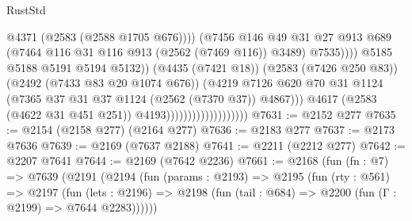 \begin{lexlean}{RustStd}
\begin{coremodule}
{\begin{coremodule}
{{{{{{{{{{{{{{{                                                          @4371
                                                          (@2583 (@2588 @1705 @676))))
                                                      (@7456
                                                        @146
                                                        @49
                                                        @31
                                                        @27
                                                        @913
                                                        @689
                                                        (@7464
                                                          @116
                                                          @31
                                                          @116
                                                          @913
                                                          (@2562 (@7469 @116))
                                                          @3489)
                                                        @7535))))
                                                @5185
                                                @5188
                                                @5191
                                                @5194
                                                @5132))
                                            (@4435 (@7421 @18))
                                            (@2583 (@7426 @250 @83))
                                            (@2492 (@7433 @83 @20 @1074 @676))
                                            (@4219
                                              @7126
                                              @620
                                              @70
                                              @31
                                              @1124
                                              (@7365 @37 @31 @37 @1124 (@2562 (@7370 @37)) @4867)))
                                          @4617
                                          (@2583 (@4622 @31 @451 @251))
                                          @4193)))))))))))))))))))
@7631 := @2152 @277
@7635 := @2154 (@2158 @277) (@2164 @277)
@7636 := @2183 @277
@7637 := @2173 @7636
@7639 := @2169 (@7637 @2188)
@7641 := @2211 (@2212 @277)
@7642 := @2207 @7641
@7644 := @2169 (@7642 @2236)
@7661 := @2168
    (fun (fn : @7) =>
    @7639
      (@2191
        (@2194
          (fun (params : @2193) =>
          @2195
            (fun (rty : @561) =>
            @2197
              (fun (lets : @2196) =>
              @2198 (fun (tail : @684) => @2200 (fun (Γ : @2199) => @7644 @2283))))))
}}}}}}}}}}}}}}}
\end{coremodule}}
\end{coremodule}
\end{lexlean}
